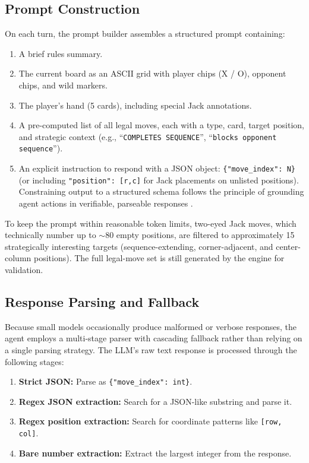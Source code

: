 \documentclass[11pt]{article}
\begin{document}
\subsection{Prompt Construction}

On each turn, the prompt builder assembles a structured prompt containing:
\begin{enumerate}[nosep,label=(\roman*)]
\item A brief rules summary.
\item The current board as an ASCII grid with player chips (X / O), opponent chips, and wild markers.
\item The player's hand (5 cards), including special Jack annotations.
\item A pre-computed list of all legal moves, each with a type, card, target position, and strategic context (e.g., ``\texttt{COMPLETES SEQUENCE}'', ``\texttt{blocks opponent sequence}'').
\item An explicit instruction to respond with a JSON object: \texttt{\{"move\_index": N\}} (or including \texttt{"position": [r,c]} for Jack placements on unlisted positions). Constraining output to a structured schema follows the principle of grounding agent actions in verifiable, parseable responses \cite{react}.
\end{enumerate}

To keep the prompt within reasonable token limits, two-eyed Jack moves, which technically number up to $\sim$80 empty positions, are filtered to approximately 15 strategically interesting targets (sequence-extending, corner-adjacent, and center-column positions). The full legal-move set is still generated by the engine for validation.

\subsection{Response Parsing and Fallback}
\label{sec:parsing}

Because small models occasionally produce malformed or verbose responses, the agent employs a multi-stage parser with cascading fallback rather than relying on a single parsing strategy. The LLM's raw text response is processed through the following stages:
\begin{enumerate}[nosep,label=(\roman*)]
\item \textbf{Strict JSON:} Parse as \texttt{\{"move\_index": int\}}.
\item \textbf{Regex JSON extraction:} Search for a JSON-like substring and parse it.
\item \textbf{Regex position extraction:} Search for coordinate patterns like \texttt{[row, col]}.
\item \textbf{Bare number extraction:} Extract the largest integer from the response.
\end{enumerate}
\end{document}
